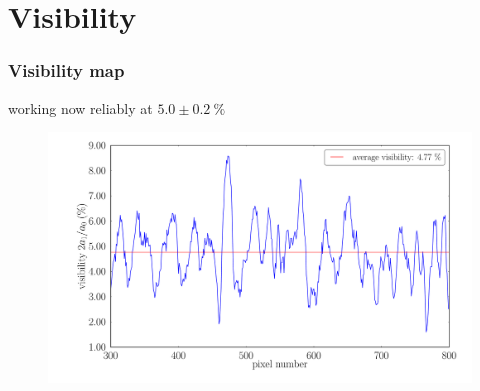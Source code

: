 \documentclass[first,firstsupp]{ETHclass}
\begin{document}
    \section{Visibility}
    \begin{frame}
        \frametitle{Visibility map}
        working now reliably at $5.0 \pm \SI{0.2}{\percent}$
        \begin{figure}[h]
            \centering
            \includegraphics[height=.65\textheight]{visibility_latest.pdf}
        \end{figure}
    \end{frame}
\end{document}
